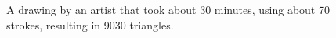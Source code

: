 \documentclass[review]{acmsiggraph}
\begin{document}






\begin{figure}
    \centering
    \caption{A drawing by an artist that took about 30 minutes, using about 70 strokes, resulting in 9030 triangles.}
    \label{fig:face}
\end{figure}
\end{document}
